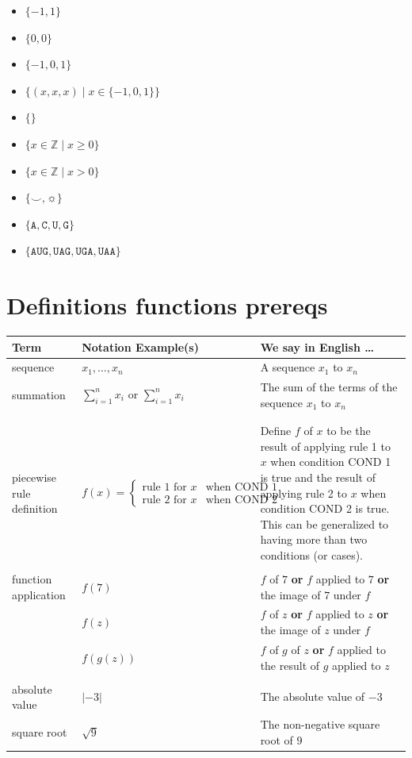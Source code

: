 \documentclass[12pt, oneside]{article}
\newcommand{\A}[0]{\texttt{A}}
\newcommand{\C}[0]{\texttt{C}}
\newcommand{\G}[0]{\texttt{G}}
\newcommand{\U}[0]{\texttt{U}}
\begin{document}
\begin{itemize}
    \item[]$\{ -1, 1\}$
    \vfill
    \item[]$\{0, 0 \}$
    \vfill
    \item[]$\{-1, 0, 1 \}$
    \vfill
    \item[]$\{(x,x,x) \mid x \in \{-1,0,1\} \}$
    \vfill
    \item[]$\{ \}$
    \vfill
    \item[]$\{ x \in \mathbb{Z} \mid x \geq 0 \}$
    \vfill
    \item[]$\{ x \in \mathbb{Z}  \mid x > 0 \}$
    \vfill
    \item[]$\{ \smile, \sun \}$
    \vfill
    \item[]$\{\A,\C,\U,\G\}$
    \vfill
    \item[]$\{\A\U\G, \U\A\G, \U\G\A, \U\A\A \}$
    \vfill
\end{itemize}
 \vfill
\section*{Definitions functions prereqs}


\begin{center}
\begin{tabular}{|p{1.2in}p{2.8in}p{3in}|}
\hline
{\bf Term} & {\bf Notation Example(s)} & {\bf We say in English \ldots } \\
\hline
sequence & $x_1, \ldots, x_n$ & A sequence $x_1$ to $x_n$ \\
summation & $\sum_{i=1}^n x_i$ or $\displaystyle{\sum_{i=1}^n x_i}$ & The sum of the terms of the sequence $x_1$ to $x_n$ \\
&&\\
&&\\
piecewise rule definition & $f(x) = \begin{cases} \text{rule 1 for } x & \text{when~COND 1} \\ \text{rule 2 for } x & \text{when COND 2}\end{cases}$ &
Define $f$ of $x$ to be the result of applying rule 1 to $x$ when condition COND 1 is true and the result of 
applying rule 2 to $x$ when condition COND 2 is true. This can be generalized to having more than two conditions
(or cases).\\
&&\\
function application & $f(7)$ & $f$ of $7$ {\bf or} $f$ applied to $7$ {\bf or} the image of $7$ under $f$\\
                     & $f(z)$ & $f$ of $z$ {\bf or} $f$ applied to $z$ {\bf or} the image of $z$ under $f$\\
                     & $f(g(z))$ & $f$ of $g$ of $z$ {\bf or} $f$ applied to the result of $g$ applied to $z$ \\
&&\\
absolute value & $\lvert -3 \rvert$ & The absolute value of $-3$ \\
square root & $\sqrt{9}$ & The non-negative square root of $9$ \\


\hline
\end{tabular}
\end{center}
\end{document}
